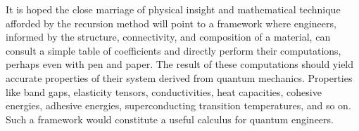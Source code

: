 It is hoped the close marriage of physical insight and mathematical technique 
afforded by the recursion method will point to a framework where engineers, informed by the
structure, connectivity, and composition of a material, can consult a simple table of
coefficients and directly perform their computations, perhaps even with 
pen and paper. The result of these computations should yield accurate 
properties of their system derived from quantum mechanics.
Properties like band gaps, elasticity tensors, conductivities, 
heat capacities, cohesive energies, adhesive energies, superconducting transition temperatures, 
and so on. Such a framework would constitute a useful calculus for quantum engineers.
